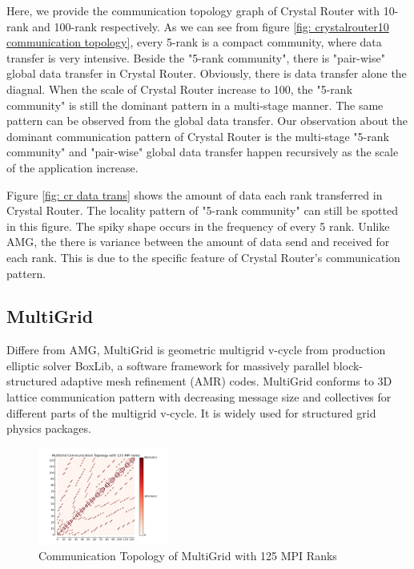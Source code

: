\documentclass[conference]{IEEEtran}
\begin{document}
Here, we provide the communication topology graph of Crystal Router with 10-rank and 100-rank respectively. As we can see from figure \ref{fig: crystalrouter10 communication topology}, every 5-rank is a compact community, where data transfer is very intensive. Beside the "5-rank community", there is "pair-wise" global data transfer in Crystal Router. Obviously, there is data transfer alone the diagnal. When the scale of Crystal Router increase to 100, the "5-rank community" is still the dominant pattern in a multi-stage manner. The same pattern can be observed from the global data transfer. Our observation about the dominant communication pattern of Crystal Router is the multi-stage "5-rank community" and "pair-wise" global data transfer happen recursively as the scale of the application increase.

Figure \ref{fig: cr data trans} shows the amount of data each rank transferred in Crystal Router. The locality pattern of "5-rank community" can still be spotted in this figure. The spiky shape occurs in the frequency of every 5 rank. Unlike AMG, the there is variance between the amount of data send and received for each rank. This is due to the specific feature of Crystal Router's communication pattern.


\subsection{MultiGrid}
\label{sec:multigrid}

Differe from AMG, MultiGrid is geometric multigrid v-cycle from production elliptic solver BoxLib, a software framework for massively parallel block-structured adaptive mesh refinement (AMR) codes. MultiGrid conforms to 3D lattice communication pattern with decreasing message size and collectives for different parts of the multigrid v-cycle. It is widely used for structured grid physics packages.

\begin{figure}[h!] 
  \centering
  \includegraphics[width=0.38\textwidth]{figs/mg/mg125_ct}
   \caption{Communication Topology of MultiGrid with 125 MPI Ranks }
   \label{fig: multigrid125 communication topology}
\end{figure}
\end{document}
